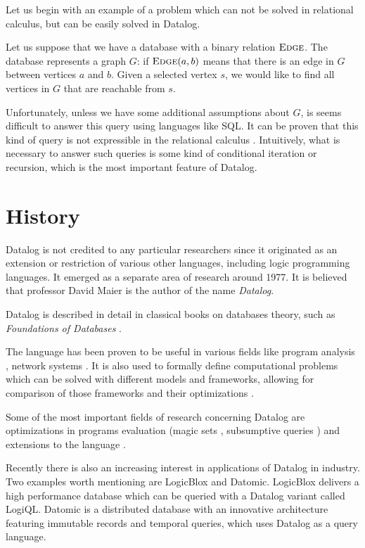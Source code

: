 \documentclass{pracamgr}
\theoremstyle{plain}
\theoremstyle{definition}
\theoremstyle{remark}
\begin{document}
Let us begin with an example of a problem which can not be solved in relational calculus, but can be easily solved in Datalog.

Let us suppose that we have a database with a binary relation $\textsc{Edge}$. The database represents a graph $G$: if $\textsc{Edge}(a, b)$ means that there is an edge in $G$ between vertices $a$ and $b$. Given a selected vertex $s$, we would like to find all vertices in $G$ that are reachable from $s$.

Unfortunately, unless we have some additional assumptions about $G$, is seems difficult to answer this query using languages like SQL. It can be proven that this kind of query is not expressible in the relational calculus \cite{fod}. Intuitively, what is necessary to answer such queries is some kind of conditional iteration or recursion, which is the most important feature of Datalog.

\section{History}

Datalog is not credited to any particular researchers since it originated as an extension or restriction of various other languages, including logic programming languages. It emerged as a separate area of research around 1977. It is believed that professor David Maier is the author of the name \emph{Datalog}.

Datalog is described in detail in classical books on databases theory, such as \emph{Foundations of Databases} \cite{fod}.

The language has been proven to be useful in various fields like program analysis \cite{pointanalysis}, network systems \cite{boomanalysis, dataloganalysis}. It is also used to formally define computational problems which can be solved with different models and frameworks, allowing for comparison of those frameworks and their optimizations \cite{ullman}. 

Some of the most important fields of research concerning Datalog are optimizations in programs evaluation (magic sets \cite{magicsets}, subsumptive queries \cite{subsumptivequeries}) and extensions to the language \cite{magicsetsexist, disjunctivedatalog, datalogrelaunched}.

Recently there is also an increasing interest in applications of Datalog in industry. Two examples worth mentioning are LogicBlox and Datomic. LogicBlox \cite{logicblox} delivers a high performance database which can be queried with a Datalog variant called LogiQL.  Datomic \cite{datomic} is a distributed database with an innovative architecture featuring immutable records and temporal queries, which uses Datalog as a query language.
\end{document}
